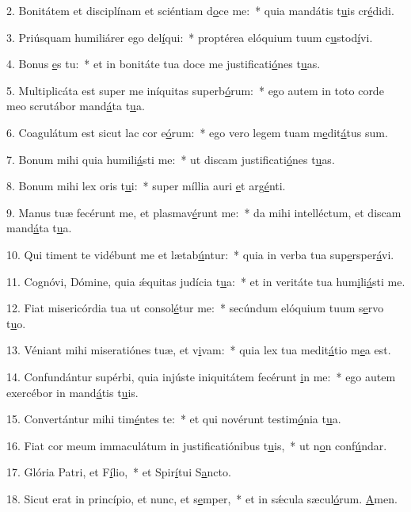 2. Bonitátem et disciplínam et sciéntiam d\uline{o}ce me:~* quia mandátis t\uline{u}is cr\uline{é}didi.\par 
3. Priúsquam humiliárer ego del\uline{í}qui:~* proptérea elóquium tuum c\uline{u}stod\uline{í}vi.\par 
4. Bonus \uline{e}s tu:~* et in bonitáte tua doce me justificati\uline{ó}nes t\uline{u}as.\par 
5. Multiplicáta est super me iníquitas superb\uline{ó}rum:~* ego autem in toto corde meo scrutábor mand\uline{á}ta t\uline{u}a.\par 
6. Coagulátum est sicut lac cor e\uline{ó}rum:~* ego vero legem tuam m\uline{e}dit\uline{á}tus sum.\par 
7. Bonum mihi quia humili\uline{á}sti me:~* ut discam justificati\uline{ó}nes t\uline{u}as.\par 
8. Bonum mihi lex oris t\uline{u}i:~* super míllia auri \uline{e}t arg\uline{é}nti.\par 
9. Manus tuæ fecérunt me, et plasmav\uline{é}runt me:~* da mihi intelléctum, et discam mand\uline{á}ta t\uline{u}a.\par 
10. Qui timent te vidébunt me et lætab\uline{ú}ntur:~* quia in verba tua sup\uline{e}rsper\uline{á}vi.\par 
11. Cognóvi, Dómine, quia ǽquitas judícia t\uline{u}a:~* et in veritáte tua hum\uline{i}li\uline{á}sti me.\par 
12. Fiat misericórdia tua ut consol\uline{é}tur me:~* secúndum elóquium tuum s\uline{e}rvo t\uline{u}o.\par 
13. Véniant mihi miseratiónes tuæ, et v\uline{i}vam:~* quia lex tua medit\uline{á}tio m\uline{e}a est.\par 
14. Confundántur supérbi, quia injúste iniquitátem fecérunt \uline{i}n me:~* ego autem exercébor in mand\uline{á}tis t\uline{u}is.\par 
15. Convertántur mihi tim\uline{é}ntes te:~* et qui novérunt testim\uline{ó}nia t\uline{u}a.\par 
16. Fiat cor meum immaculátum in justificatiónibus t\uline{u}is,~* ut n\uline{o}n conf\uline{ú}ndar.\par 
17. Glória Patri, et F\uline{í}lio,~* et Spir\uline{í}tui S\uline{a}ncto.\par 
18. Sicut erat in princípio, et nunc, et s\uline{e}mper,~* et in sǽcula sæcul\uline{ó}rum. \uline{A}men.\par 

